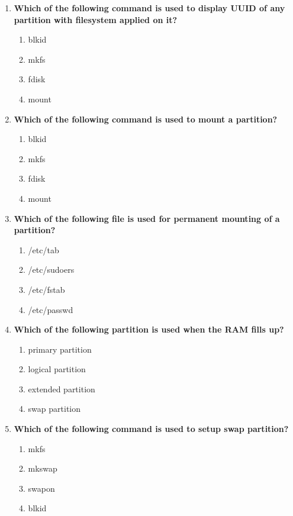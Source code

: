 \begin{flushleft}
\begin{enumerate}
		\item \textbf{Which of the following command is used to display UUID of any partition with filesystem applied on it?}
		\begin{enumerate}[label=(\alph*)]
			\item blkid  %
			\item mkfs  
			\item fdisk
			\item mount
		\end{enumerate}
		\bigskip
		\bigskip	


		\item \textbf{Which of the following command is used to mount a partition?}
		\begin{enumerate}[label=(\alph*)]
			\item blkid  
			\item mkfs  
			\item fdisk
			\item mount   %
		\end{enumerate}
		\bigskip
		\bigskip	

		\item \textbf{Which of the following file is used for permanent mounting of a partition?}
		\begin{enumerate}[label=(\alph*)]
			\item /etc/tab
			\item /etc/sudoers
			\item /etc/fstab   %
			\item /etc/passwd 
		\end{enumerate}
		\bigskip
		\bigskip	

		\item \textbf{Which of the following partition is used when the RAM fills up?}
			\begin{enumerate}[label=(\alph*)]
				\item primary partition
				\item logical partition  
				\item extended partition 
				\item swap partition   %
			\end{enumerate}
			\bigskip
			\bigskip

		\item \textbf{Which of the following command is used to setup swap partition?}
		\begin{enumerate}[label=(\alph*)]
			\item mkfs
			\item mkswap   %
			\item swapon   %
			\item blkid
		\end{enumerate}
		\bigskip
		\bigskip


\end{enumerate}
\end{flushleft}

